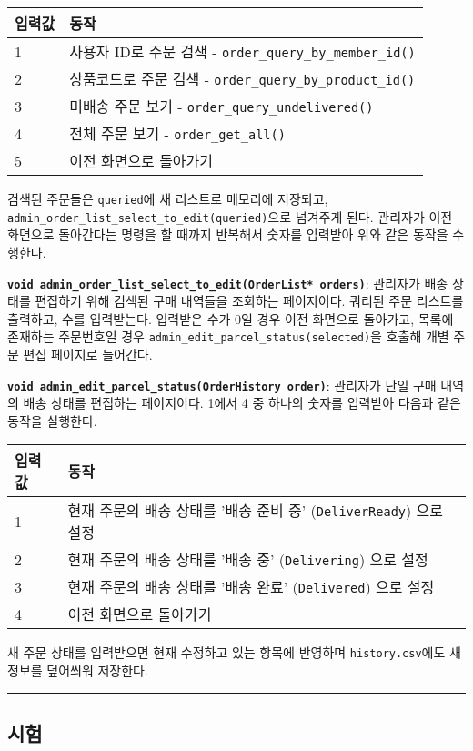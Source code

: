 \documentclass[runningheads]{llncs}
\begin{document}
\begin{tabularx}{\textwidth}{l|X}
	\hline
		입력값	& 동작 \\
	\hline
		1 & 사용자 ID로 주문 검색 - \texttt{order_query_by_member_id()} \\
		2 & 상품코드로 주문 검색 - \texttt{order_query_by_product_id()} \\
		3 & 미배송 주문 보기 - \texttt{order_query_undelivered()} \\
		4 & 전체 주문 보기 - \texttt{order_get_all()} \\
		5 & 이전 화면으로 돌아가기 \\
	\hline
\end{tabularx}

검색된 주문들은 \texttt{queried}에 새 리스트로 메모리에 저장되고, \texttt{admin_order_list_select_to_edit(queried)}으로 넘겨주게 된다. 관리자가 이전 화면으로 돌아간다는 명령을 할 때까지 반복해서 숫자를 입력받아 위와 같은 동작을 수행한다.

\textbf{\texttt{void admin_order_list_select_to_edit(OrderList* orders)}}: 관리자가 배송 상태를 편집하기 위해 검색된 구매 내역들을 조회하는 페이지이다. 쿼리된 주문 리스트를 출력하고, 수를 입력받는다. 입력받은 수가 0일 경우 이전 화면으로 돌아가고, 목록에 존재하는 주문번호일 경우 \texttt{admin_edit_parcel_status(selected)}을 호출해 개별 주문 편집 페이지로 들어간다. 

\textbf{\texttt{void admin_edit_parcel_status(OrderHistory order)}}: 관리자가 단일 구매 내역의 배송 상태를 편집하는 페이지이다. 1에서 4 중 하나의 숫자를 입력받아 다음과 같은 동작을 실행한다.

\begin{tabularx}{\textwidth}{l|X}
	\hline
		입력값	& 동작 \\
	\hline
		1 & 현재 주문의 배송 상태를 '배송 준비 중' (\texttt{DeliverReady}) 으로 설정 \\
		2 & 현재 주문의 배송 상태를 '배송 중' (\texttt{Delivering}) 으로 설정 \\
		3 & 현재 주문의 배송 상태를 '배송 완료' (\texttt{Delivered}) 으로 설정 \\
		4 & 이전 화면으로 돌아가기 \\
	\hline
\end{tabularx}

새 주문 상태를 입력받으면 현재 수정하고 있는 항목에 반영하며 \texttt{history.csv}에도 새 정보를 덮어씌워 저장한다.

\noindent\rule{2cm}{0.4pt}
 
\subsection{시험}
\end{document}
